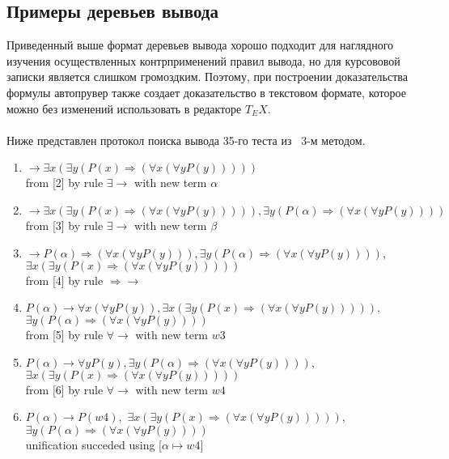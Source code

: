 \documentclass{cw1}
\begin{document}
\subsection{Примеры деревьев вывода}
Приведенный выше формат деревьев вывода хорошо подходит для наглядного изучения
осуществленных контрприменений правил вывода, но для курсововой записки является
слишком громоздким. Поэтому, при построении доказательства формулы автопрувер также
создает доказательство в текстовом формате, которое можно без изменений использовать
в редакторе $T_EX$.
\paragraph{}
Ниже представлен протокол поиска вывода 35-го теста из~\cite{tests} 3-м методом.
\begin{enumerate}
\item $\rightarrow\exists  x ( \exists  y (P(x)  \Rightarrow  ( \forall  x ( \forall  y P(y)))))$\\
 from [2] by rule $\exists \rightarrow $ with new term $\alpha$
\item $\rightarrow\exists x(\exists y(P(x)\Rightarrow(\forall x(\forall y P(y))))),\exists y(P(\alpha)\Rightarrow(\forall x(\forall y P(y))))$\\
 from [3] by rule $\exists \rightarrow $ with new term $\beta$
\item $\rightarrow P(\alpha)\Rightarrow(\forall x(\forall y P(y))),\exists y (P(\alpha)\Rightarrow(\forall x(\forall y P(y)))),$\\$\exists x(\exists y (P(x)\Rightarrow(\forall x(\forall y P(y)))))$\\
 from [4] by rule $\Rightarrow \rightarrow $
\item $P(\alpha)\rightarrow   \forall  x ( \forall  y P(y)),\exists x (\exists y (P(x)\Rightarrow (\forall x (\forall y P(y))))),$\\$\exists y (P(\alpha)\Rightarrow (\forall x (\forall y P(y))))$\\
 from [5] by rule $\forall \rightarrow $ with new term $w3$
\item $P(\alpha)\rightarrow \forall y P(y),\exists y (P(\alpha) \Rightarrow (\forall x (\forall y P(y)))),$\\$\exists x (\exists y (P(x)\Rightarrow(\forall x (\forall y P(y)))))$\\
 from [6] by rule $\forall \rightarrow $ with new term $w4$
\item $P(\alpha)\rightarrow  P(w4),$ $\exists  x (\exists y (P(x)\Rightarrow(\forall x (\forall y P(y))))),$\\$\exists  y (P(\alpha)\Rightarrow  ( \forall  x ( \forall  y P(y))))$\\
 unification succeded using [$\alpha \mapsto w4$]
\end{enumerate}
\end{document}
